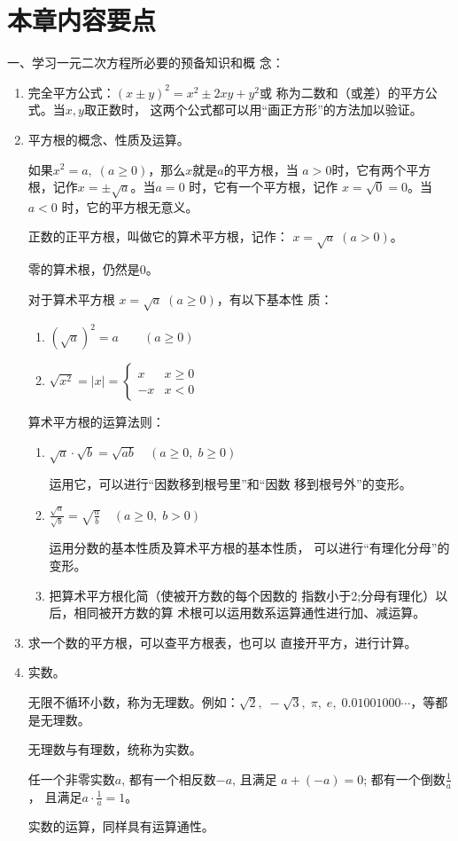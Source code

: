 \section*{本章内容要点}
一、学习一元二次方程所必要的预备知识和概
念：
\begin{enumerate}
    \item 完全平方公式：$(x\pm y)^2=x^2\pm 2xy+y^2$或
称为二数和（或差）的平方公式。当$x,y$取正数时，
这两个公式都可以用“画正方形”的方法加以验证。
\item 平方根的概念、性质及运算。

如果$x^2=a,\; (a\ge 0)$，那么$x$就是$a$的平方根，当
$a>0$时，它有两个平方根，记作$x=\pm\sqrt{a}$。当$a=0$
时，它有一个平方根，记作
$x=\sqrt{0}=0$。当$a<0$
时，它的平方根无意义。

正数的正平方根，叫做它的算术平方根，记作：
$x=\sqrt{a}\; (a>0)$。

零的算术根，仍然是0。

对于算术平方根
$x=\sqrt{a}\; (a\ge 0)$，有以下基本性
质：
\begin{enumerate}
    \item $(\sqrt{a})^2=a\qquad (a\ge 0)$
    \item $\sqrt{x^2}=|x|=\begin{cases}
        x& x\ge 0\\
        -x& x<0
    \end{cases}$
\end{enumerate}


算术平方根的运算法则：
\begin{enumerate}
    \item $\sqrt{a}\cdot \sqrt{b}=\sqrt{ab}\quad (a\ge 0,\; b\ge 0)$
    
    运用它，可以进行“因数移到根号里”和“因数
移到根号外”的变形。

\item $\frac{\sqrt{a}}{\sqrt{b}}=\sqrt{\frac{a}{b}}\quad (a\ge 0,\; b> 0)$

运用分数的基本性质及算术平方根的基本性质，
可以进行“有理化分母”的变形。

\item 把算术平方根化简（使被开方数的每个因数的
指数小于2;分母有理化）以后，相同被开方数的算
术根可以运用数系运算通性进行加、减运算。
\end{enumerate}

\item 求一个数的平方根，可以查平方根表，也可以
直接开平方，进行计算。
\item 实数。

无限不循环小数，称为无理数。例如：$\sqrt{2},\; -\sqrt{3},\; \pi,\; e,\; 0.01001000\cdots$，等都是无理数。

无理数与有理数，统称为实数。

任一个非零实数$a$, 都有一个相反数$-a$, 且满足
$a+(-a)=0$; 都有一个倒数$\frac{1}{a}$，
且满足$a\cdot \frac{1}{a}=1$。

实数的运算，同样具有运算通性。
\end{enumerate}

